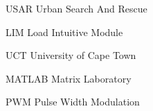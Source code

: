 \clearpage
\begin{Nomencl}[1cm]
    \item[USAR] Urban Search And Rescue
    \item[LIM] Load Intuitive Module
    \item[UCT] University of Cape Town
    \item[MATLAB] Matrix Laboratory
    \item[PWM] Pulse Width Modulation

\end{Nomencl}

